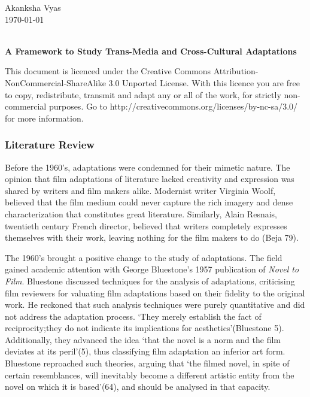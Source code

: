\documentclass[12pt]{article}
\begin{document}
\begin{flushleft}
Akanksha Vyas\\
\today\\
\end{flushleft}
\begin{center}
\textbf{\large{} \\ \small{A Framework to Study Trans-Media and Cross-Cultural
Adaptations }} 
\end{center}

\vspace{0.2in}
\parbox[b]{5.5in}{ This document is licenced under the Creative Commons
 Attribution-NonCommercial-ShareAlike 3.0 Unported License. With this licence
 you are free to copy, redistribute, transmit and adapt any or all of the work,
 for strictly non-commercial purposes. 
Go to http://creativecommons.org/licenses/by-nc-sa/3.0/ for more information.} 
\setlength{\parindent}{0.5in}
\subsubsection*{Literature Review}
Before the 1960's, adaptations were condemned for their mimetic nature. The
opinion that film adaptations of literature lacked creativity and expression
was shared by writers and film makers alike. Modernist writer Virginia Woolf,
believed that the film medium could never capture the rich imagery and dense
characterization that constitutes great literature. Similarly, Alain Resnais,
twentieth century French director, believed that writers completely expresses
themselves with their work, leaving nothing for the film makers to do
(Beja 79).

The 1960's brought a positive change to the study of adaptations. The field
gained academic attention with George Bluestone's 1957 publication of \textit{Novel to Film}. 
Bluestone discussed techniques for the analysis of adaptations, criticising film reviewers for
valuating film adaptations based on their fidelity to the original work. He
reckoned that such analysis techniques were purely quantitative and did not
address the adaptation process. `They merely establish the fact of reciprocity;they
do not indicate its implications for aesthetics'(Bluestone 5). Additionally, they
advanced the idea `that the novel is a norm and the film deviates at its peril'(5), 
thus classifying film adaptation an inferior art form. Bluestone 
reproached such theories, arguing that `the filmed novel, in spite
of certain resemblances, will inevitably become a different artistic entity
   from the novel on which it is based'(64), and should be analysed in that
   capacity.
\end{document}
